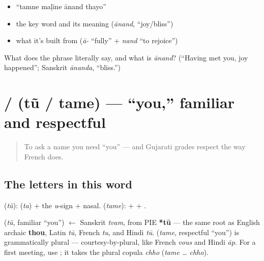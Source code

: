 \begin{itemize}
\raggedright
  \item \textquotedblleft{}tamne maḷīne ānand thayo\textquotedblright{}
  \item the key word and its meaning (\emph{ānand}, \textquotedblleft{}joy/bliss\textquotedblright{})
  \item what it's built from (\emph{ā-} \textquotedblleft{}fully\textquotedblright{} + \emph{nand} \textquotedblleft{}to rejoice\textquotedblright{})
\end{itemize}

\begin{tcolorbox}[breakable,colback=teal!4,colframe=teal!35!black,title={Before you move on}]
What does the phrase literally say, and what is \emph{ānand}? (\textquotedblleft{}Having met you, joy happened\textquotedblright{}; Sanskrit \emph{ānanda}, \textquotedblleft{}bliss.\textquotedblright{})
\end{tcolorbox}
\section[\gu{તું} / \gu{તમે}]{ /  (tũ / tame) — \textquotedblleft{}you,\textquotedblright{} familiar and respectful}

\label{lesson:GU-C02-tu-tame}



\begin{quote}
To ask a name you need \textquotedblleft{}you\textquotedblright{} — and Gujarati grades respect the way French does.
\end{quote}

\subsection*{The letters in this word}
\textbf{} (\emph{tũ}): \textbf{} (\emph{ta}) + the \emph{u}-sign + nasal. \textbf{} (\emph{tame}): \textbf{} + \textbf{} + \textbf{}.

\begin{cousinweb}
\textbf{} (\emph{tũ}, familiar \textquotedblleft{}you\textquotedblright{}) $\leftarrow$ Sanskrit \emph{tvam}, from PIE \textbf{*tū} — the same root as English archaic \textbf{thou}, Latin \emph{tū}, French \emph{tu}, and Hindi \emph{tū}. \textbf{} (\emph{tame}, respectful \textquotedblleft{}you\textquotedblright{}) is grammatically plural — courtesy-by-plural, like French \emph{vous} and Hindi \emph{āp}. For a first meeting, use \textbf{}; it takes the plural copula \emph{chho} (\emph{tame … chho}).
\end{cousinweb}

